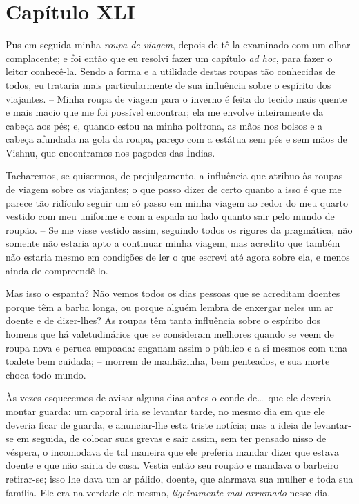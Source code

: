 \section{Capítulo XLI}

 Pus em seguida minha\textit{ roupa de viagem}, depois de tê-la
examinado com um olhar complacente; e foi então que eu resolvi fazer um
capítulo \textit{ad hoc}, para fazer o leitor conhecê-la. Sendo a forma
e a utilidade destas roupas tão conhecidas de todos, eu trataria mais
particularmente de sua influência sobre o espírito dos viajantes. --
Minha roupa de viagem para o inverno é feita do tecido mais quente e
mais macio que me foi possível encontrar; ela me envolve inteiramente
da cabeça aos pés; e, quando estou na minha poltrona, as mãos nos
bolsos e a cabeça afundada na gola da roupa, pareço com a estátua sem
pés e sem mãos de Vishnu, que encontramos nos pagodes das
Índias. 

 Tacharemos, se quisermos, de prejulgamento, a influência que atribuo às
roupas de viagem sobre os viajantes; o que posso dizer de certo quanto
a isso é que me parece tão ridículo seguir um só passo em minha viagem
ao redor do meu quarto vestido com meu uniforme e com a espada ao lado
quanto sair pelo mundo de roupão. -- Se me visse vestido assim,
seguindo todos os rigores da pragmática, não somente não estaria apto a
continuar minha viagem, mas acredito que também não estaria mesmo em
condições de ler o que escrevi até agora sobre ela, e menos ainda de
compreendê-lo.

 Mas isso o espanta? Não vemos todos os dias pessoas que se acreditam
doentes porque têm a barba longa, ou porque alguém lembra de enxergar
neles um ar doente e de dizer-lhes? As roupas têm tanta influência
sobre o espírito dos homens que há valetudinários que se consideram
melhores quando se veem de roupa nova e peruca empoada: enganam assim o
público e a si mesmos com uma toalete bem cuidada; -- morrem de
manhãzinha, bem penteados, e sua morte choca todo mundo.

 Às vezes esquecemos de avisar alguns dias antes o conde de\ldots\ que ele
deveria montar guarda: um caporal iria se levantar tarde, no mesmo dia
em que ele deveria ficar de guarda, e anunciar-lhe esta triste notícia;
mas a ideia de levantar-se em seguida, de colocar suas grevas e sair
assim, sem ter pensado nisso de véspera, o incomodava de tal maneira
que ele preferia mandar dizer que estava doente e que não sairia de
casa. Vestia então seu roupão e mandava o barbeiro retirar-se; isso lhe
dava um ar pálido, doente, que alarmava sua mulher e toda sua família.
Ele era na verdade ele mesmo, \textit{ligeiramente mal arrumado} nesse dia. 

